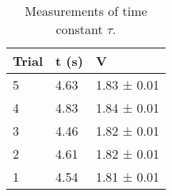 \documentclass{article}
\begin{document}
\begin{table}[]
	\begin{tabular}{@{}lll@{}}
		\toprule
		Trial & t (s) & V           \\ \midrule
		5     & 4.63  & 1.83 ± 0.01 \\
		4     & 4.83  & 1.84 ± 0.01 \\
		3     & 4.46  & 1.82 ± 0.01 \\
		2     & 4.61  & 1.82 ± 0.01 \\
		1     & 4.54  & 1.81 ± 0.01 \\ \bottomrule
	\end{tabular}
	\caption{Measurements of time constant $\tau$.}
	\label{tau}
\end{table}
\end{document}
